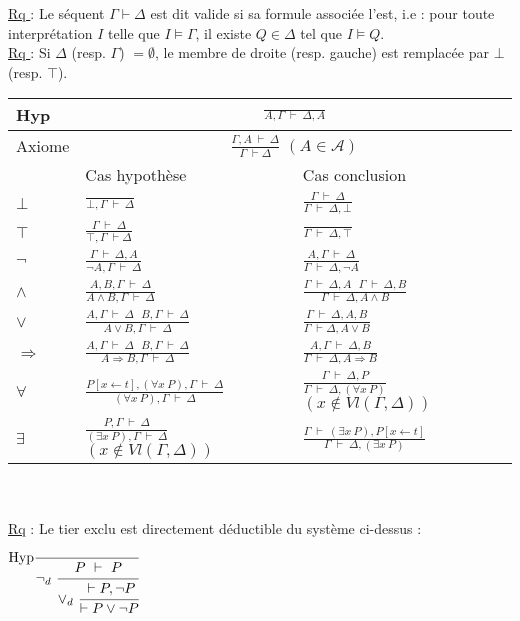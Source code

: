 \documentclass[11pt,a4paper]{article}
\begin{document}
\underline{Rq }: Le séquent $\Gamma \vdash \Delta$ est dit valide si sa formule associée l'est, i.e : pour toute interprétation $I$ telle que $I \models \Gamma$, il existe $Q\in \Delta$ tel que $I \models Q$.\\
\underline{Rq }: Si $\Delta$ (resp. $\Gamma$) $= \emptyset$, le membre de droite (resp. gauche) est remplacée par $\bot$ (resp. $\top$). \\

\begin{tabular}{|C{3cm}|C{6cm}|C{7cm}|}
  \hline
  Hyp &   \\
  \hline
  Axiome &   \\
  \hline
  & Cas hypothèse & Cas conclusion \\
  \hline
  $\bot$ & {\Large $\frac{}{\bot , \Gamma \ \vdash \ \Delta}$} & {\Large $\frac{\Gamma \ \vdash \ \Delta}{\Gamma \ \vdash \ \Delta, \bot}$} \\
  \hline
  $\top$ & {\Large $\frac{\Gamma \ \vdash \ \Delta}{\top,\Gamma \ \vdash \Delta}$} & {\Large $\frac{}{\Gamma \ \vdash \ \Delta, \top}$}  \\
  \hline
  $\lnot$ & {\Large $\frac{\Gamma \  \vdash \ \Delta,A  }{\lnot A,\Gamma \  \vdash \ \Delta}$}  & {\Large $\frac{A,\Gamma \ \vdash \ \Delta}{\Gamma \  \vdash \ \Delta, \lnot A }$} \\
  \hline
  $\land$ & {\Large $\frac{A,B,\Gamma \ \vdash \ \Delta}{A\land B, \Gamma \ \vdash \ \Delta}$} & {\Large $\frac{\Gamma \  \vdash \ \Delta,A \ \ \ \Gamma \ \vdash \ \Delta, B }{\Gamma \  \vdash \ \Delta, A\land B }$} \\
  \hline
  $\lor$ & {\Large $\frac{A,\Gamma \  \vdash \ \Delta \ \ \ B,\Gamma \ \vdash \ \Delta}{A\lor B,\Gamma \  \vdash \ \Delta }$} & {\Large $\frac{\Gamma \  \vdash \ \Delta,A,B}{\Gamma \  \vdash \Delta,A\lor B  }$} \\
  \hline
  $\Rightarrow$ & {\Large $\frac{A,\Gamma \  \vdash \ \Delta	 \ \ \ B,\Gamma \ \vdash \ \Delta}{A \Rightarrow B,\Gamma \  \vdash \ \Delta}$} & {\Large $\frac{A,\Gamma \  \vdash \ \Delta,B}{\Gamma \  \vdash \ \Delta,A \Rightarrow B}$} \\
  \hline
  $\forall$ & {\Large $\frac{P[x \leftarrow t], (\forall x \ P), \Gamma \ \vdash \ \Delta}{(\forall x \ P),\Gamma \  \vdash \  \Delta}$} & {\Large $\frac{\Gamma \  \vdash \ \Delta,P}{\Gamma \  \vdash \ \Delta,(\forall x \ P) }$}$(x \notin Vl(\Gamma, \Delta))$\\
  \hline
  $\exists$ & {\Large $\frac{P,\Gamma \ \vdash \ \Delta }{(\exists x \ P),\Gamma \  \vdash \ \Delta}$}$(x \notin Vl(\Gamma,\Delta))$ & {\Large $\frac{\Gamma \ \vdash \ (\exists x \ P),P[x \leftarrow t]}{\Gamma \  \vdash \ \Delta,(\exists x \ P)}$} \\
  \hline
\end{tabular}
\\
\\

\underline{Rq} : Le tier exclu est directement déductible du système ci-dessus : 
$\text{Hyp}\cfrac{}{\lnot_d \ \cfrac{P \ \vdash \ P}{\lor_d \ \cfrac{\vdash P, \lnot P}{\vdash P \lor \lnot P}}}$
\end{document}
